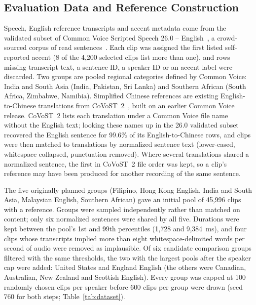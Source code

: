 \subsection{Evaluation Data and Reference Construction}
\label{sec:data}

Speech, English reference transcripts and accent metadata come from the
validated subset of Common Voice Scripted Speech 26.0 --
English~\cite{cv26release}, a crowd-sourced corpus of read
sentences~\cite{ardila2020commonvoice}. Each clip was assigned the first
listed self-reported accent (8 of the 4,200 selected clips list more than
one), and rows missing transcript text, a sentence ID, a speaker ID or an
accent label were discarded. Two groups are pooled regional categories defined
by Common Voice: India and South Asia (India, Pakistan, Sri Lanka) and Southern
African (South Africa, Zimbabwe, Namibia). Simplified Chinese references are
existing English-to-Chinese translations from CoVoST~2~\cite{wang2021covost2},
built on an earlier Common Voice release. CoVoST~2 lists each translation
under a Common Voice file name without the English text; looking these names
up in the 26.0 validated subset recovered the English sentence for 99.6\% of
its English-to-Chinese rows, and clips were then matched to translations by
normalized sentence text (lower-cased, whitespace collapsed, punctuation
removed). Where several translations shared a normalized sentence, the first in
CoVoST~2 file order was kept, so a clip's reference may have been produced for
another recording of the same sentence.

The five originally planned groups (Filipino, Hong Kong English, India and
South Asia, Malaysian English, Southern African) gave an initial pool of
45,996 clips with a reference. Groups were sampled independently rather than
matched on content; only six normalized sentences were shared by all five.
Durations were kept between the pool's 1st and 99th percentiles (1,728 and
9,384~ms), and four clips whose transcripts implied more than eight
whitespace-delimited words per second of audio were removed as implausible. Of
six candidate comparison groups filtered with the same thresholds, the two
with the largest pools after the speaker cap were added: United States and
England English (the others were Canadian, Australian, New Zealand and
Scottish English). Every group was capped at 100 randomly chosen clips per speaker before
600 clips per group were drawn (seed 760 for both steps;
Table~\ref{tab:dataset}).

